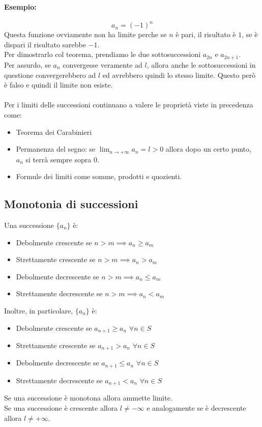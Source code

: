 \documentclass[12pt,a4paper]{article}
\begin{document}
\paragraph{Esempio:}
\[
a_n = (-1)^n
\]
Questa funzione ovviamente non ha limite perche se $n$ è pari, il risultato è $1$, se è dispari il risultato sarebbe $-1$.\\
Per dimostrarlo col teorema, prendiamo le due sottosuccessioni $a_{2n}$ e $a_{2n + 1}$.\\
Per assurdo, se $a_n$ convergesse veramente ad $l$, allora anche le sottosuccessioni in questione convergerebbero ad $l$ ed avrebbero quindi lo stesso limite. Questo però è falso e quindi il limite non esiste.\\\\
Per i limiti delle successioni continuano a valere le proprietà viste in precedenza come:
\begin{itemize}
  \item Teorema dei Carabinieri
  \item Permanenza del segno: se $\lim_{n \to +\infty} a_n = l > 0$ allora dopo un certo punto, $a_n$ si terrà sempre sopra 0.
  \item Formule dei limiti come somme, prodotti e quozienti.
\end{itemize}
\subsection{Monotonia di successioni}
Una successione $\{a_n\}$ è:
\begin{itemize}
  \item Debolmente crescente se $n > m \implies a_n \geq a_m$
  \item Strettamente crescente se $n > m \implies a_n > a_m$
  \item Debolmente decrescente se $n > m \implies a_n \leq a_m$
  \item Strettamente decrescente se $n > m \implies a_n < a_m$
\end{itemize}
Inoltre, in particolare, $\{a_n\}$ è:
\begin{itemize}
  \item Debolmente crescente se $a_{n+1} \geq a_n$ $\forall n \in S$
  \item Strettamente crescente se $a_{n+1} > a_n$ $\forall n \in S$
  \item Debolmente decrescente se $a_{n+1} \leq a_n$ $\forall n \in S$
  \item Strettamente decrescente se $a_{n+1} < a_n$ $\forall n \in S$
\end{itemize}
Se una successione è monotona allora ammette limite.\\
Se una successione è crescente allora $l \ne -\infty$ e analogamente se è decrescente allora $l \ne +\infty$.
\end{document}
